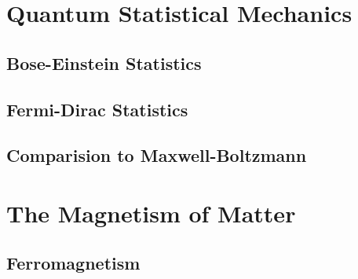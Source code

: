 \documentclass[11pt,a4paper]{article}
\theoremstyle{theorem}
\theoremstyle{definition}
\theoremstyle{definition}
\theoremstyle{remark}
\theoremstyle{definition}
\theoremstyle{remark}
\begin{document}
\section{Quantum Statistical Mechanics}

\subsection{Bose-Einstein Statistics}

\subsection{Fermi-Dirac Statistics}

\subsection{Comparision to Maxwell-Boltzmann}

\section{The Magnetism of Matter}

\subsection{Ferromagnetism}
\end{document}
